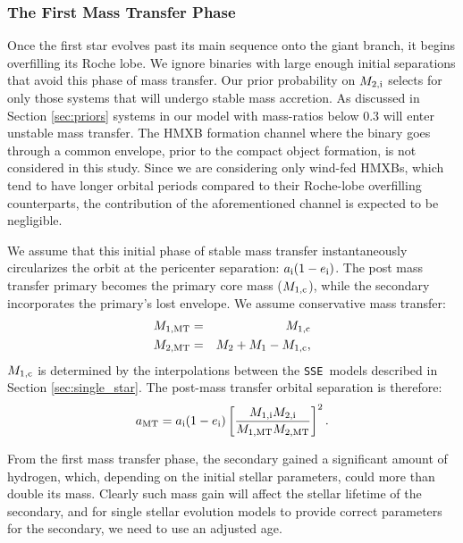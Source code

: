 \documentclass[usenatbib]{mnras}
\newcommand{\sse}{{\tt SSE}}
\begin{document}
\subsubsection{The First Mass Transfer Phase} \label{sec:trans_MT}

Once the first star evolves past its main sequence onto the giant branch, it begins overfilling its Roche lobe. We ignore binaries with large enough initial separations that avoid this phase of mass transfer. Our prior probability on $M_{\rm 2,i}$ selects for only those systems that will undergo stable mass accretion. As discussed in Section \ref{sec:priors} systems in our model with mass-ratios below 0.3 will enter unstable mass transfer. The HMXB formation channel where the binary goes through a common envelope, prior to the compact object formation, is not considered in this study. Since we are considering only wind-fed HMXBs, which tend to have longer orbital periods compared to their Roche-lobe overfilling counterparts, the contribution of the aforementioned channel is expected to be negligible. 

We assume that this initial phase of stable mass transfer instantaneously circularizes the orbit at the pericenter separation: $a_{\rm i} (1-e_{\rm i})$. The post mass transfer primary becomes the primary core mass ($M_{\rm 1,c}$), while the secondary incorporates the primary's lost envelope. We assume conservative mass transfer:
\begin{eqnarray} 
M_{\rm 1, MT} &=& M_{\rm 1,c} \\
M_{\rm 2, MT} &=& M_2 + M_1 - M_{\rm 1,c},
\end{eqnarray}
$M_{\rm 1,c}$ is determined by the interpolations between the \sse\ models described in Section \ref{sec:single_star}. The post-mass transfer orbital separation is therefore:
\begin{equation}
a_{\rm MT} = a_{\rm i} (1-e_{\rm i}) \left[ \frac{M_{\rm 1,i} M_{\rm 2,i}}{M_{\rm 1, MT} M_{\rm 2, MT}} \right]^2.
\end{equation}



From the first mass transfer phase, the secondary gained a significant amount of hydrogen, which, depending on the initial stellar parameters, could more than double its mass. Clearly such mass gain will affect the stellar lifetime of the secondary, and for single stellar evolution models to provide correct parameters for the secondary, we need to use an adjusted age. 
\end{document}
